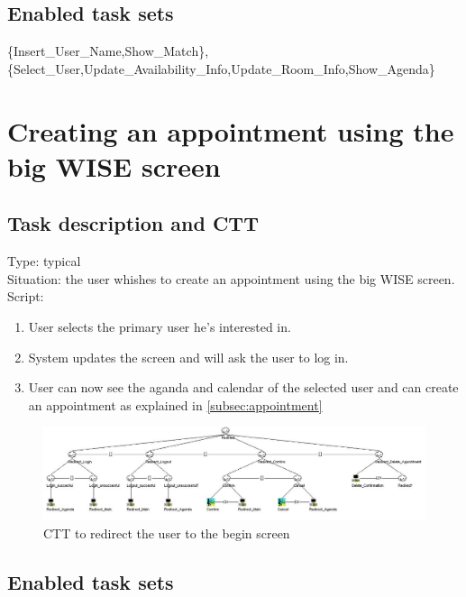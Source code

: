 \documentclass[11pt, a4paper,svglistings]{report}
\begin{document}
\subsection{Enabled task sets}

\{Insert\_User\_Name,Show\_Match\},\{Select\_User,Update\_Availability\_Info,Update\_Room\_Info,Show\_Agenda\}


\newpage

\section{Creating an appointment using the big WISE screen}

\subsection{Task description and CTT}

Type: typical \\
Situation: the user whishes to create an appointment using the big WISE screen. \\
Script:
\begin{enumerate}
\item User selects the primary user he's interested in.
\item System updates the screen and will ask the user to log in.
\item User can now see the aganda and calendar of the selected user and can create an appointment as explained in \ref{subsec:appointment}
\end{enumerate}

\begin{figure}[H]
\centering
    \includegraphics[width=1\textwidth]{Redirect.jpg}
  \caption[Redirect CTT]{\label{fig:CreateAppointment}CTT to redirect the user to the begin screen}
\end{figure}

\subsection{Enabled task sets}
\end{document}
